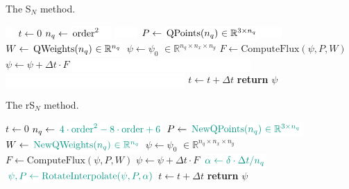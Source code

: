 \begin{minipage}{0.49\textwidth}
	\begin{algorithm}[H]
		\centering
		\caption{The S$_N$ method.}\label{algorithm1}
		\begin{algorithmic}[1]
			$\fakehighlight{\color{white}{\delta}}$
			\State $t \gets 0$
			\State $n_q \gets \fakehighlight{\text{order}^2 {\color{white}48}}$ $\fakehighlight{\color{white}{\text{New}}}$
			\State $P \gets\fakehighlight{\text{QPoints}(n_q)$ $\in \mathbb{R}^{3 \times n_q}}$$\fakehighlight{\color{white}{\text{New}}}$
			\State $W\gets\fakehighlight{\text{QWeights}(n_q)$ $\in \mathbb{R}^{n_q}}$
			\State $\psi \gets\psi_0$ $\in \mathbb{R}^{n_q \times n_x \times n_y}$
			\State $F \gets \text{ComputeFlux}(\psi,P,W)$
			\State $\psi \gets \psi + \Delta t \cdot F$
			\State $\fakehighlight{\color{white}{\psi,Q \gets \text{RotateInterpolate}(\psi,Q,\delta\cdot \delta t /n_q)}}$
			\State $\fakehighlight{\color{white}{\psi,Q \gets \text{RotateInterpolate}(\psi,Q,\delta\cdot \delta t /n_q)}}$
			\State $t\gets t + \Delta t$
			\EndWhile
			\State \textbf{return} $\psi$
			\EndFunction
		\end{algorithmic}
		\label{alg:SN}
	\end{algorithm}
\end{minipage}
\hfill
\begin{minipage}{0.49\textwidth}
	\begin{algorithm}[H]
		\centering
		\caption{The rS$_N$ method.}
		\label{algorithm1}
		\begin{algorithmic}[1]
			\State $t \gets 0$
			\State $n_q \gets  \highlight{4\cdot\text{order}^2 - 8\cdot\text{order}+6}$
			\State $P \gets\highlight{\text{NewQPoints}(n_q)$ $\in \mathbb{R}^{3 \times n_q}}$
			\State $W\gets\highlight{\text{NewQWeights}(n_q)$ $\in \mathbb{R}^{n_q}}$
			\State $\psi \gets\psi_0$ $\in \mathbb{R}^{n_q \times n_x \times n_y}$
			\State $F \gets \text{ComputeFlux}(\psi,P,W)$
			\State $\psi \gets \psi + \Delta t \cdot F$
			\State $\highlight{\alpha \gets \delta\cdot \Delta t /n_q}$
			\State $\highlight{\psi,P \gets \text{RotateInterpolate}(\psi,P,\alpha)}$
			\State $t\gets t + \Delta t$
			\EndWhile
			\State \textbf{return} $\psi$
			\EndFunction
		\end{algorithmic}
		\label{alg:rSN}
	\end{algorithm}
	
\end{minipage}
